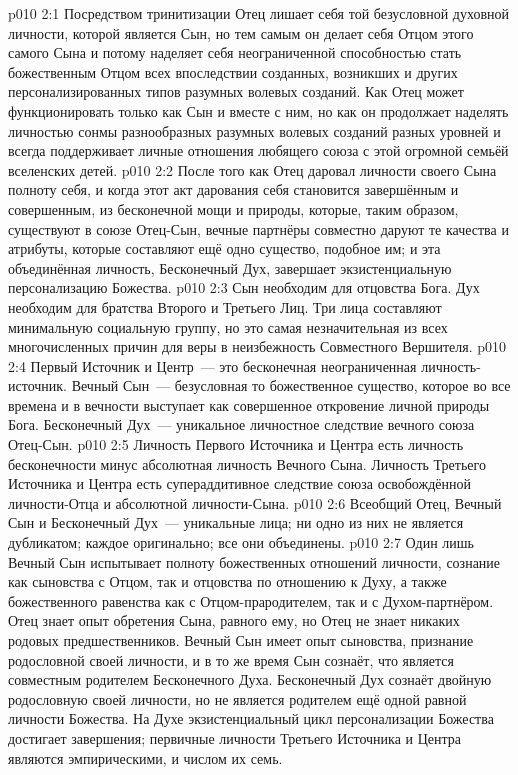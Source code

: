 \vs p010 2:1 Посредством тринитизации Отец лишает себя той безусловной духовной личности, которой является Сын, но тем самым он делает себя Отцом этого самого Сына и потому наделяет себя неограниченной способностью стать божественным Отцом всех впоследствии созданных, возникших и  других персонализированных типов разумных волевых созданий. Как  Отец может функционировать только как Сын и вместе с ним, но как  он продолжает наделять личностью сонмы разнообразных разумных волевых созданий разных уровней и всегда поддерживает личные отношения любящего союза с этой огромной семьёй вселенских детей.
\vs p010 2:2 После того как Отец даровал личности своего Сына полноту себя, и когда этот акт дарования себя становится завершённым и совершенным, из бесконечной мощи и природы, которые, таким образом, существуют в союзе Отец-Сын, вечные партнёры совместно даруют те качества и атрибуты, которые составляют ещё одно существо, подобное им; и эта объединённая личность, Бесконечный Дух, завершает экзистенциальную персонализацию Божества.
\vs p010 2:3 Сын необходим для отцовства Бога. Дух необходим для братства Второго и Третьего Лиц. Три лица составляют минимальную социальную группу, но это самая незначительная из всех многочисленных причин для веры в неизбежность Совместного Вершителя.
\vs p010 2:4 \pc Первый Источник и Центр~--- это бесконечная  неограниченная личность\hyp{}источник. Вечный Сын~--- безусловная  то божественное существо, которое во все времена и в вечности выступает как совершенное откровение личной природы Бога. Бесконечный Дух~---  уникальное личностное следствие вечного союза Отец-Сын.
\vs p010 2:5 \pc Личность Первого Источника и Центра есть личность бесконечности минус абсолютная личность Вечного Сына. Личность Третьего Источника и Центра есть супераддитивное следствие союза освобождённой личности\hyp{}Отца и абсолютной личности\hyp{}Сына.
\vs p010 2:6 \pc Всеобщий Отец, Вечный Сын и Бесконечный Дух~--- уникальные лица; ни одно из них не является дубликатом; каждое оригинально; все они объединены.
\vs p010 2:7 \pc Один лишь Вечный Сын испытывает полноту божественных отношений личности, сознание как сыновства с Отцом, так и отцовства по отношению к Духу, а также божественного равенства как с Отцом\hyp{}прародителем, так и с Духом\hyp{}партнёром. Отец знает опыт обретения Сына, равного ему, но Отец не знает никаких родовых предшественников. Вечный Сын имеет опыт сыновства, признание родословной своей личности, и в то же время Сын сознаёт, что является совместным родителем Бесконечного Духа. Бесконечный Дух сознаёт двойную родословную своей личности, но не является родителем ещё одной равной личности Божества. На Духе экзистенциальный цикл персонализации Божества достигает завершения; первичные личности Третьего Источника и Центра являются эмпирическими, и числом их семь.
